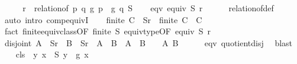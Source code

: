\begin{isabellebody}
%
\isadelimproof
%
\endisadelimproof
%
\isatagproof
{}\isamarkupfalse%
\ {\isacharminus}{\kern0pt}\isanewline
\ \ \isamarkupfalse%
\ {\isacharquery}{\kern0pt}r\ {\isacharequal}{\kern0pt}\ {\isachardoublequoteopen}relation{\isacharunderscore}{\kern0pt}of\ {\isacharparenleft}{\kern0pt}{\isasymlambda}p\ q{\isachardot}{\kern0pt}\ g\ p\ {\isacharequal}{\kern0pt}\ g\ q{\isacharparenright}{\kern0pt}\ S{\isachardoublequoteclose}\isanewline
\ \ \isamarkupfalse%
\ eqv{\isacharcolon}{\kern0pt}\ {\isachardoublequoteopen}equiv\ S\ {\isacharquery}{\kern0pt}r{\isachardoublequoteclose}\isanewline
\ \ \ \ \isamarkupfalse%
\ relation{\isacharunderscore}{\kern0pt}of{\isacharunderscore}{\kern0pt}def\ \isamarkupfalse%
\ {\isacharparenleft}{\kern0pt}auto\ intro{\isacharcolon}{\kern0pt}\ comp{\isacharunderscore}{\kern0pt}equivI{\isacharparenright}{\kern0pt}\isanewline
\ \ \isamarkupfalse%
\ finite{\isacharcolon}{\kern0pt}\ {\isachardoublequoteopen}C\ {\isasymin}\ S{\isacharslash}{\kern0pt}{\isacharslash}{\kern0pt}{\isacharquery}{\kern0pt}r\ {\isasymLongrightarrow}\ finite\ C{\isachardoublequoteclose}\ \ C\isanewline
\ \ \ \ \isamarkupfalse%
\ {\isacharparenleft}{\kern0pt}fact\ finite{\isacharunderscore}{\kern0pt}equiv{\isacharunderscore}{\kern0pt}class{\isacharbrackleft}{\kern0pt}OF\ {\isacharbackquoteopen}finite\ S{\isacharbackquoteclose}\ equiv{\isacharunderscore}{\kern0pt}type{\isacharbrackleft}{\kern0pt}OF\ {\isacharbackquoteopen}equiv\ S\ {\isacharquery}{\kern0pt}r{\isacharbackquoteclose}{\isacharbrackright}{\kern0pt}{\isacharbrackright}{\kern0pt}{\isacharparenright}{\kern0pt}\isanewline
\ \ \isamarkupfalse%
\ disjoint{\isacharcolon}{\kern0pt}\ {\isachardoublequoteopen}A\ {\isasymin}\ S{\isacharslash}{\kern0pt}{\isacharslash}{\kern0pt}{\isacharquery}{\kern0pt}r\ {\isasymLongrightarrow}\ B\ {\isasymin}\ S{\isacharslash}{\kern0pt}{\isacharslash}{\kern0pt}{\isacharquery}{\kern0pt}r\ {\isasymLongrightarrow}\ A\ {\isasymnoteq}\ B\ {\isasymLongrightarrow}\ A\ {\isasyminter}\ B\ {\isacharequal}{\kern0pt}\ {\isacharbraceleft}{\kern0pt}{\isacharbraceright}{\kern0pt}{\isachardoublequoteclose}\ \ A\ B\isanewline
\ \ \ \ \isamarkupfalse%
\ eqv\ quotient{\isacharunderscore}{\kern0pt}disj\ \isamarkupfalse%
\ blast\isanewline
\isanewline
\ \ \isamarkupfalse%
\ {\isacharquery}{\kern0pt}cls\ {\isacharequal}{\kern0pt}\ {\isachardoublequoteopen}{\isasymlambda}y{\isachardot}{\kern0pt}\ {\isacharbraceleft}{\kern0pt}x\ {\isasymin}\ S{\isachardot}{\kern0pt}\ y\ {\isacharequal}{\kern0pt}\ g\ x{\isacharbraceright}{\kern0pt}{\isachardoublequoteclose}\isanewline

\end{isabellebody}
